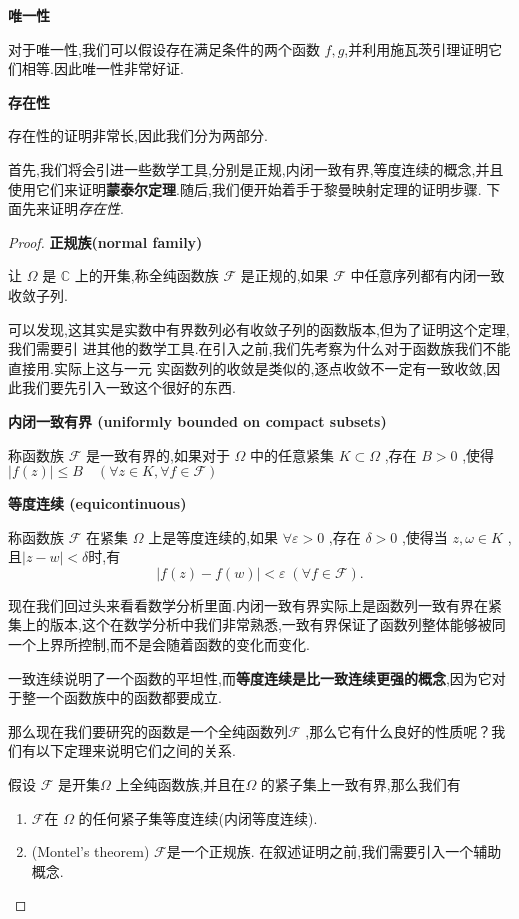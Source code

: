 \textbf{唯一性}


对于唯一性,我们可以假设存在满足条件的两个函数 $f,g$,并利用施瓦茨引理证明它们相等.因此唯一性非常好证.

\textbf{存在性}


存在性的证明非常长,因此我们分为两部分.


首先,我们将会引进一些数学工具,分别是正规,内闭一致有界,等度连续的概念,并且使用它们来证明\textbf{蒙泰尔定理}.随后,我们便开始着手于黎曼映射定理的证明步骤.
下面先来证明\textit{存在性}.
\begin{proof}
\textbf{正规族(normal family)}


让 $\Omega$ 是 $\mathbb{C}$ 上的开集,称全纯函数族 $\mathcal{F}$ 是正规的,如果 $\mathcal{F}$ 中任意序列都有内闭一致收敛子列.


可以发现,这其实是实数中有界数列必有收敛子列的函数版本,但为了证明这个定理,我们需要引 进其他的数学工具.在引入之前,我们先考察为什么对于函数族我们不能直接用.实际上这与一元 实函数列的收敛是类似的,逐点收敛不一定有一致收敛,因此我们要先引入一致这个很好的东西.

\textbf{内闭一致有界 (uniformly bounded on compact subsets)}


称函数族 $\mathcal{F}$ 是一致有界的,如果对于 $\Omega$ 中的任意紧集 $K \subset \Omega$ ,存在 $B>0$ ,使得 $|f(z)| \leqslant B \quad (\forall z \in K , \forall f \in \mathcal{F})$

\textbf{等度连续 (equicontinuous)}


称函数族 $\mathcal{F}$ 在紧集 $\Omega$ 上是等度连续的,如果 $\forall \varepsilon>0$ ,存在 $\delta>0$ ,使得当 $z, \omega \in K$ ,且$|z-w|<\delta$时,有
\[
  |f(z)-f(w)|<\varepsilon\; (\forall f\in \mathcal{F}).
\]

现在我们回过头来看看数学分析里面.内闭一致有界实际上是函数列一致有界在紧集上的版本,这个在数学分析中我们非常熟悉,一致有界保证了函数列整体能够被同一个上界所控制,而不是会随着函数的变化而变化.


一致连续说明了一个函数的平坦性,而\textbf{等度连续是比一致连续更强的概念},因为它对于整一个函数族中的函数都要成立.


那么现在我们要研究的函数是一个全纯函数列$\mathcal{F}$ ,那么它有什么良好的性质呢？我们有以下定理来说明它们之间的关系.
\begin{theorem}
  假设 $\mathcal{F}$ 是开集$\Omega$ 上全纯函数族,并且在$\Omega$ 的紧子集上一致有界,那么我们有
\begin{enumerate}
  \item $\mathcal{F}$在 $\Omega$ 的任何紧子集等度连续(内闭等度连续).
  \item (Montel's theorem) $\mathcal{F}$是一个正规族. 在叙述证明之前,我们需要引入一个辅助概念.
\end{enumerate}



\end{theorem}
\end{proof}
